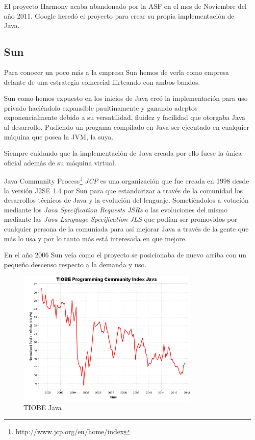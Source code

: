 \documentclass[11pt]{scrartcl}
\begin{document}
El proyecto Harmony acaba abandonado por la ASF en el mes de Noviembre del año 2011. Google heredó el proyecto para crear su propia implementación de Java. 

\subsection{Sun}

Para conocer un poco más a la empresa Sun hemos de verla como empresa delante de una estrategia comercial flirteando con ambos bandos.

Sun como hemos expuesto en los inicios de Java creó la implementación para uso privado haciéndolo expansible paultinamente y ganando adeptos exponencialmente debido a su versatilidad, fluidez y facilidad que otorgaba Java al desarrollo. Pudiendo un progama compilado en Java ser ejecutado en cualquier máquina que posea la JVM, la suya.

Siempre cuidando que la implementación de Java creada por ello fuese la única oficial además de su máquina virtual.

Java Community Process\footnote{http://www.jcp.org/en/home/index} \emph{JCP} es una organización que fue creada en 1998 desde la versión J2SE 1.4 por Sun para que estandarizar a través de la comunidad los desarrollos técnicos de Java y la evolución del lenguaje. Sometiéndolos a votación mediante los \emph{Java Specification Requests JSRs} o las evoluciones del mismo mediante las \emph{Java Language Specification JLS} que podían ser promovidos por cualquier persona de la comuniada para así mejorar Java a través de la gente que más lo usa y por lo tanto más está interesada en que mejore.

En el año 2006 Sun veía como el proyecto se posicionaba de nuevo arriba con un pequeño descenso respecto a la demanda y uso.

\begin{figure}[H]
  \centering
  \includegraphics[width=0.8\textwidth]{images/history_Java}
  \caption{TIOBE Java}
  \label{fig:tiobejava}
\end{figure}
\end{document}

